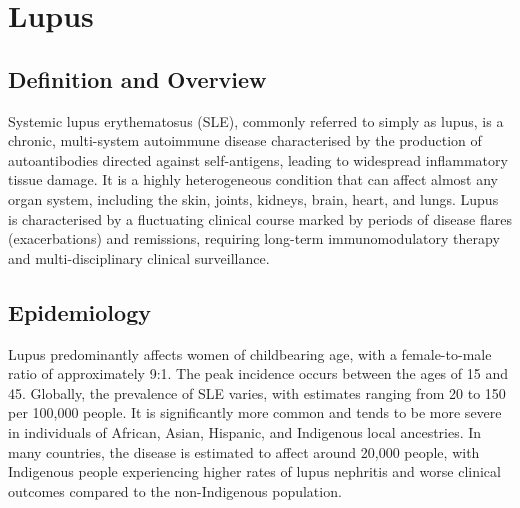 \chapter{Lupus}

\section*{Definition and Overview}
Systemic lupus erythematosus (SLE), commonly referred to simply as lupus, is a chronic, multi-system autoimmune disease characterised by the production of autoantibodies directed against self-antigens, leading to widespread inflammatory tissue damage. It is a highly heterogeneous condition that can affect almost any organ system, including the skin, joints, kidneys, brain, heart, and lungs. Lupus is characterised by a fluctuating clinical course marked by periods of disease flares (exacerbations) and remissions, requiring long-term immunomodulatory therapy and multi-disciplinary clinical surveillance.

\section*{Epidemiology}
Lupus predominantly affects women of childbearing age, with a female-to-male ratio of approximately 9:1. The peak incidence occurs between the ages of 15 and 45. Globally, the prevalence of SLE varies, with estimates ranging from 20 to 150 per 100,000 people. It is significantly more common and tends to be more severe in individuals of African, Asian, Hispanic, and Indigenous local ancestries. In many countries, the disease is estimated to affect around 20,000 people, with Indigenous people experiencing higher rates of lupus nephritis and worse clinical outcomes compared to the non-Indigenous population.


